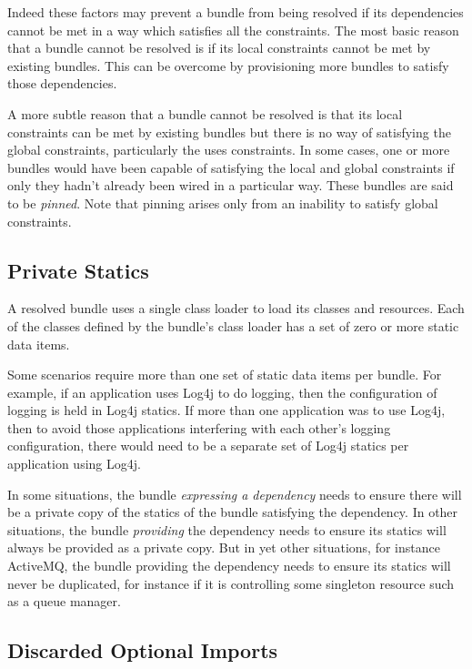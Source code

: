 \documentclass[a4paper,12pt]{article}
\begin{document}
Indeed these factors may prevent a bundle from being resolved if its dependencies
cannot be met in a way which satisfies all the constraints. The most basic
reason that a bundle cannot be resolved is if its local constraints cannot be met
by existing bundles. This can be overcome by provisioning more bundles to satisfy
those dependencies.

A more subtle reason that a bundle cannot be resolved is that
its local constraints can be met by existing bundles but there is no way of satisfying
the global constraints, particularly the uses constraints. In some cases, one or more
bundles would have been capable of satisfying the local and global constraints
if only they hadn't already been wired in a particular way. These bundles are said
to be \textit{pinned}.
Note that pinning arises only from an inability to satisfy global constraints.

\subsection{Private Statics}

A resolved bundle uses a single class loader to load its classes and resources.
Each of the classes defined by the bundle's class loader has a set of zero or
more static data items.

Some scenarios require more than one set of static data items per bundle. For
example, if an application uses Log4j to do logging, then the configuration
of logging is held in Log4j statics. If more than one application was to 
use Log4j, then to avoid those applications interfering with
each other's logging configuration, there would need to be a separate set
of Log4j statics per application using Log4j.

In some situations, the bundle \textit{expressing a dependency} needs to ensure there
will be a private copy of the statics of the bundle satisfying the dependency.
In other situations, the bundle \textit{providing} the dependency needs to ensure
its statics will always be provided as a private copy. But in yet other situations,
for instance ActiveMQ, the bundle providing the dependency needs to ensure
its statics will never be duplicated, for instance if it is controlling some singleton
resource such as a queue manager.

\subsection{Discarded Optional Imports}
\end{document}
